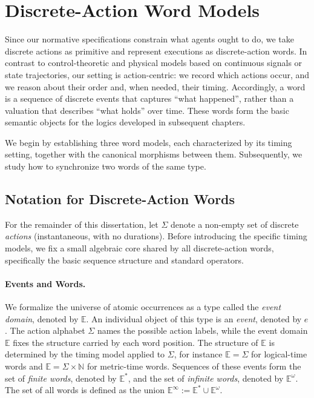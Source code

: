 \section{Discrete-Action Word Models}\label{traces}
Since our normative specifications constrain what agents ought to do, we take discrete actions as primitive and represent executions as discrete-action words.
In contrast to control-theoretic and physical models based on continuous signals or state trajectories, our setting is action-centric: we record which actions occur, and we reason about their order and, when needed, their timing.
Accordingly, a word is a sequence of discrete events that captures ``what happened'', rather than a valuation that describes ``what holds'' over time.
These words form the basic semantic objects for the logics developed in subsequent chapters.

We begin by establishing three word models, each characterized by its timing setting, together with the canonical morphisms between them. Subsequently, we study how to synchronize two words of the same type.

\subsection{Notation for Discrete-Action Words}
For the remainder of this dissertation, let \(\Sigma\) denote a non-empty set of discrete \emph{actions} (instantaneous, with no durations). Before introducing the specific timing models, we fix a small algebraic core shared by all discrete-action words, specifically the basic sequence structure and standard operators.

\paragraph{Events and Words.}
We formalize the universe of atomic occurrences as a type called the \emph{event domain}, denoted by $\mathbb{E}$.
An individual object of this type is an \emph{event}, denoted by $e$.
The action alphabet \(\Sigma\) names the possible action labels, while the event domain \(\mathbb{E}\) fixes the structure carried by each word position. The structure of \(\mathbb{E}\) is determined by the timing model applied to \(\Sigma\), for instance \(\mathbb{E}=\Sigma\) for logical-time words and \(\mathbb{E}=\Sigma\times\mathbb{N}\) for metric-time words.
Sequences of these events form the set of \emph{finite words}, denoted by $\mathbb{E}^*$, and the set of \emph{infinite words}, denoted by $\mathbb{E}^\omega$.
The set of all words is defined as the union $\mathbb{E}^\infty := \mathbb{E}^* \cup \mathbb{E}^\omega$.


